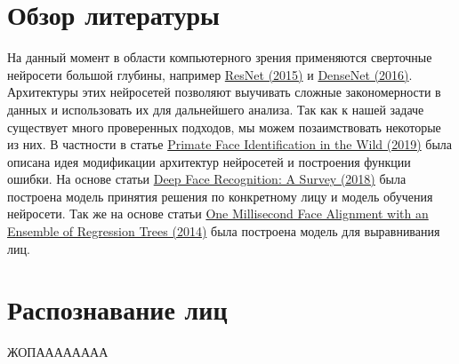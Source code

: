 \documentclass[a4paper,14pt]{extarticle}
\newcommand{\bibref}[3]{\hyperlink{#1}{#2 (#3)}} %
\begin{document}
    \section{Обзор литературы}
    На данный момент в области компьютерного зрения применяются сверточные нейросети большой глубины, например \bibref{resnet}{ResNet}{2015} и \bibref{densenet}{DenseNet}{2016}. Архитектуры этих нейросетей позволяют выучивать сложные закономерности в данных и использовать их для дальнейшего анализа. Так как к нашей задаче существует много проверенных подходов, мы можем позаимствовать некоторые из них. В частности в статье \bibref{pfid}{Primate Face Identification in the Wild}{2019} была описана идея модификации архитектур нейросетей и построения функции ошибки. На основе статьи \bibref{face}{Deep Face Recognition: A Survey}{2018} была построена модель принятия решения по конкретному лицу и модель обучения нейросети. Так же на основе статьи \bibref{align}{One Millisecond Face Alignment with an Ensemble of Regression Trees}{2014} была построена модель для выравнивания лиц.

    \section{Распознавание лиц}
    ЖОПАААААААА
\end{document}
